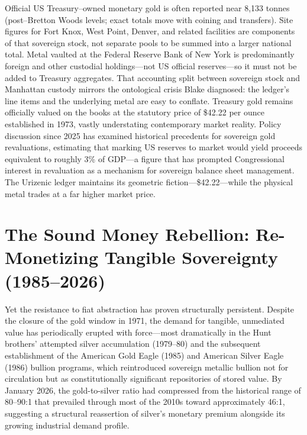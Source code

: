\documentclass[
]{article}
\begin{document}
Official US Treasury--owned monetary gold is often reported near 8,133
tonnes (post--Bretton Woods levels; exact totals move with coining and
transfers). Site figures for Fort Knox, West Point, Denver, and related
facilities are components of that sovereign stock, not separate pools to
be summed into a larger national total. Metal vaulted at the Federal
Reserve Bank of New York is predominantly foreign and other custodial
holdings---not US official reserves---so it must not be added to
Treasury aggregates. That accounting split between sovereign stock and
Manhattan custody mirrors the ontological crisis Blake diagnosed: the
ledger's line items and the underlying metal are easy to conflate.
Treasury gold remains officially valued on the books at the statutory
price of \$42.22 per ounce established in 1973, vastly understating
contemporary market reality. Policy discussion since 2025 has examined
historical precedents for sovereign gold revaluations, estimating that
marking US reserves to market would yield proceeds equivalent to roughly
3\% of GDP---a figure that has prompted Congressional interest in
revaluation as a mechanism for sovereign balance sheet management. The
Urizenic ledger maintains its geometric fiction---\$42.22---while the
physical metal trades at a far higher market price.

\newpage

\section{The Sound Money Rebellion: Re-Monetizing Tangible Sovereignty
(1985--2026)}\label{the-sound-money-rebellion-re-monetizing-tangible-sovereignty-19852026}

Yet the resistance to fiat abstraction has proven structurally
persistent. Despite the closure of the gold window in 1971, the demand
for tangible, unmediated value has periodically erupted with
force---most dramatically in the Hunt brothers' attempted silver
accumulation (1979--80) and the subsequent establishment of the American
Gold Eagle (1985) and American Silver Eagle (1986) bullion programs,
which reintroduced sovereign metallic bullion not for circulation but as
constitutionally significant repositories of stored value. By January
2026, the gold-to-silver ratio had compressed from the historical range
of 80--90:1 that prevailed through most of the 2010s toward
approximately 46:1, suggesting a structural reassertion of silver's
monetary premium alongside its growing industrial demand profile.
\end{document}

